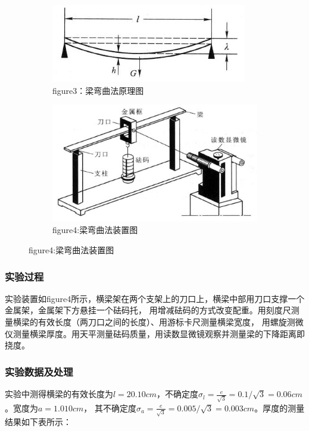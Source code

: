 \documentclass{article}
\begin{document}
    \begin{figure}[htb]
        \centering
        \begin{subfigure}[h]{0.52\textwidth}
            \includegraphics[width=\textwidth]{梁弯曲法原理图.jpg}
            \caption{figure3：梁弯曲法原理图}
        \end{subfigure}
        \begin{subfigure}[h]{0.44\textwidth}
            \includegraphics[width=\textwidth]{梁弯曲发装置图.jpg}
            \caption{figure4:梁弯曲法装置图}
        \end{subfigure}
    \end{figure}

    \subsubsection{实验过程}
    实验装置如figure4所示，横梁架在两个支架上的刀口上，横梁中部用刀口支撑一个金属架，金属架下方悬挂一个砝码托，
    用增减砝码的方式改变配重。用刻度尺测量横梁的有效长度（两刀口之间的长度）、用游标卡尺测量横梁宽度，
    用螺旋测微仪测量横梁厚度。用天平测量砝码质量，用读数显微镜观察并测量梁的下降距离即挠度。

    \subsubsection{实验数据及处理}
    实验中测得横梁的有效长度为$l=20.10cm$，不确定度$\sigma_l=\frac{e}{\sqrt{3}}=0.1/\sqrt{3}=0.06cm$。宽度为$a=1.010cm$，
    其不确定度$\sigma_a=\frac{e}{\sqrt{3}}=0.005/\sqrt{3}=0.003cm$。厚度的测量结果如下表所示：
\end{document}
